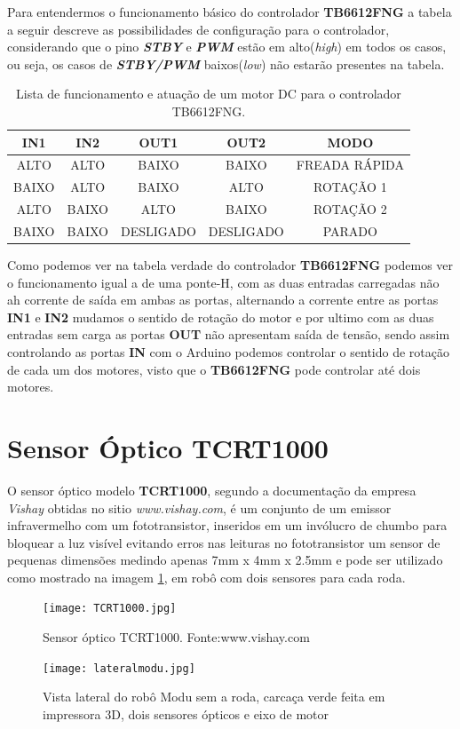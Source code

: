\documentclass[a4paper,12pt,portuguese]{ufms-cpcx}
\begin{document}
Para entendermos o funcionamento básico do controlador \textbf{TB6612FNG} a tabela a seguir descreve as possibilidades de configuração para o controlador, considerando que o pino \textit{\textbf{STBY}} e \textit{\textbf{PWM}} estão em alto(\textit{high}) em todos os casos, ou seja, os casos de \textit{\textbf{STBY/PWM}} baixos(\textit{low}) não estarão presentes na tabela.
\begin{table}[!h]
	\renewcommand{\arraystretch}{1.3}
	\centering
	\begin{tabular}{|c|c|c|c|c|}
		\hline
		\textbf{IN1} & \textbf{IN2} & \textbf{OUT1} & \textbf{OUT2} & \textbf{MODO} \\ \hline
		    ALTO     &     ALTO     &     BAIXO     &     BAIXO     & FREADA RÁPIDA \\ \hline
		   BAIXO     &     ALTO     &     BAIXO     &     ALTO      &   ROTAÇÃO 1   \\ \hline
		    ALTO     &    BAIXO     &     ALTO      &     BAIXO     &   ROTAÇÃO 2   \\ \hline
		   BAIXO     &    BAIXO     &   DESLIGADO   &   DESLIGADO   &    PARADO     \\ \hline
	\end{tabular}
	\caption[Tabela verdade controle motor]{Lista de funcionamento e atuação de um motor DC para o controlador TB6612FNG.}
	\label{Tab:TB6612FNG}
\end{table}
Como podemos ver na tabela verdade do controlador \textbf{TB6612FNG} podemos ver o funcionamento igual a de uma ponte-H, com as duas entradas carregadas não ah corrente de saída em ambas as portas, alternando a corrente entre as portas \textbf{IN1} e \textbf{IN2} mudamos o sentido de rotação do motor e por ultimo com as duas entradas sem carga as portas \textbf{OUT} não apresentam saída de tensão, sendo assim controlando as portas \textbf{IN} com o Arduino podemos controlar o sentido de rotação de cada um dos motores, visto que o \textbf{TB6612FNG} pode controlar até dois motores.

\section{Sensor Óptico TCRT1000}\label{TCRT1000}
O sensor óptico modelo \textbf{TCRT1000}, segundo a documentação da empresa \textit{Vishay} obtidas no sitio \textit{www.vishay.com}, é um conjunto de um emissor infravermelho com um fototransistor, inseridos em um invólucro de chumbo para bloquear a luz visível evitando erros nas leituras no fototransistor um sensor de pequenas dimensões medindo apenas 7mm x 4mm x 2.5mm e pode ser utilizado como mostrado na imagem \ref{fig:lateralmodu}, em robô com dois sensores para cada roda.
\begin{figure}[H]
	\centering
	\texttt{[image: TCRT1000.jpg]}
	\caption{Sensor óptico TCRT1000. Fonte:www.vishay.com}
\end{figure}
\begin{figure}[H]
	\centering
	\texttt{[image: lateralmodu.jpg]}
	\caption{Vista lateral do robô Modu sem a roda, carcaça verde feita em impressora 3D, dois sensores ópticos e eixo de motor}
	\label{fig:lateralmodu}
\end{figure}
\end{document}
